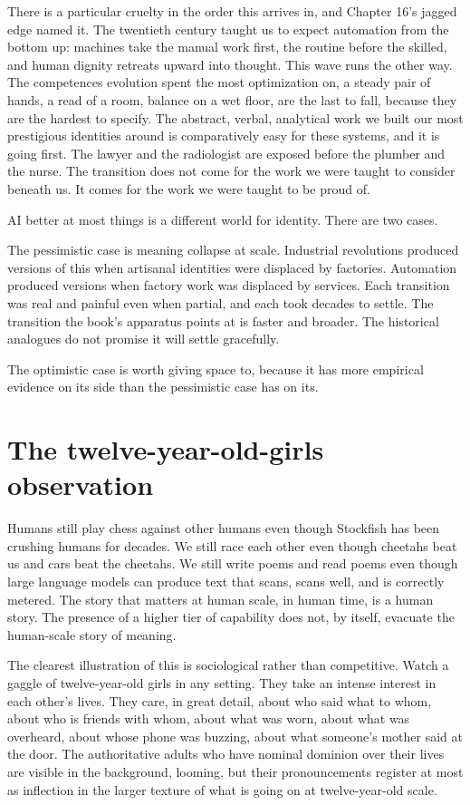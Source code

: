 There is a particular cruelty in the order this arrives in, and Chapter 16's jagged edge named it. The twentieth century taught us to expect automation from the bottom up: machines take the manual work first, the routine before the skilled, and human dignity retreats upward into thought. This wave runs the other way. The competences evolution spent the most optimization on, a steady pair of hands, a read of a room, balance on a wet floor, are the last to fall, because they are the hardest to specify. The abstract, verbal, analytical work we built our most prestigious identities around is comparatively easy for these systems, and it is going first. The lawyer and the radiologist are exposed before the plumber and the nurse. The transition does not come for the work we were taught to consider beneath us. It comes for the work we were taught to be proud of.

AI better at most things is a different world for identity. There are two cases.

The pessimistic case is meaning collapse at scale. Industrial revolutions produced versions of this when artisanal identities were displaced by factories. Automation produced versions when factory work was displaced by services. Each transition was real and painful even when partial, and each took decades to settle. The transition the book's apparatus points at is faster and broader. The historical analogues do not promise it will settle gracefully.

The optimistic case is worth giving space to, because it has more empirical evidence on its side than the pessimistic case has on its.

\section*{The twelve-year-old-girls observation}

Humans still play chess against other humans even though Stockfish has been crushing humans for decades. We still race each other even though cheetahs beat us and cars beat the cheetahs. We still write poems and read poems even though large language models can produce text that scans, scans well, and is correctly metered. The story that matters at human scale, in human time, is a human story. The presence of a higher tier of capability does not, by itself, evacuate the human-scale story of meaning.

The clearest illustration of this is sociological rather than competitive. Watch a gaggle of twelve-year-old girls in any setting. They take an intense interest in each other's lives. They care, in great detail, about who said what to whom, about who is friends with whom, about what was worn, about what was overheard, about whose phone was buzzing, about what someone's mother said at the door. The authoritative adults who have nominal dominion over their lives are visible in the background, looming, but their pronouncements register at most as inflection in the larger texture of what is going on at twelve-year-old scale.

